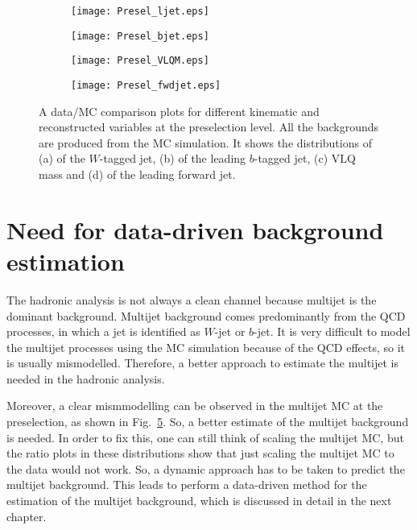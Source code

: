 \begin{figure}[hbt!]
	\centering
	\begin{subfigure}{.45\textwidth}
		\centering
		\texttt{[image: Presel\_ljet.eps]}
		\caption{}
		\label{fig:analysisstrategy:eventselection:preselection:ljet}
	\end{subfigure}
	\begin{subfigure}{0.45\textwidth}
		\centering
		\texttt{[image: Presel\_bjet.eps]}
		\caption{}
		\label{fig:analysisstrategy:eventselection:preselection:bjet}
	\end{subfigure}
	\begin{subfigure}{.45\textwidth}
		\centering
		\texttt{[image: Presel\_VLQM.eps]}
		\caption{}
		\label{fig:analysisstrategy:eventselection:preselection:vlqm}
	\end{subfigure}
	\begin{subfigure}{.45\textwidth}
		\centering
		\texttt{[image: Presel\_fwdjet.eps]}
		\caption{}
		\label{fig:analysisstrategy:eventselection:preselection:forwardjet}
	\end{subfigure}
	\caption{A data/MC comparison plots for different kinematic and reconstructed variables at the preselection level. All the backgrounds are produced from the MC simulation. It shows the distributions of (a) \pt of the $W$-tagged jet, (b) \pt of the leading $b$-tagged jet, (c) VLQ mass and (d) \pt of the leading forward jet.}
	\label{fig:analysisstrategy:eventselection:preselection}
\end{figure}

\section{Need for data-driven background estimation}%
\label{sec:analysisstrategy:datadriven}
The hadronic analysis is not always a clean channel because multijet is the dominant background. Multijet background comes predominantly from the QCD processes, in which a jet is identified as $W$-jet or $b$-jet. It is very difficult to model the multijet processes using the MC simulation because of the QCD effects, so it is usually mismodelled. Therefore, a better approach to estimate the multijet is needed in the hadronic analysis.

Moreover, a clear mismmodelling can be observed in the multijet MC at the preselection, as shown in Fig.\ \ref{fig:analysisstrategy:eventselection:preselection}. So, a better estimate of the multijet background is needed. In order to fix this, one can still think of scaling the multijet MC, but the ratio plots in these distributions show that just scaling the multijet MC to the data would not work. So, a dynamic approach has to be taken to predict the multijet background. This leads to perform a data-driven method for the estimation of the multijet background, which is discussed in detail in the next chapter.

